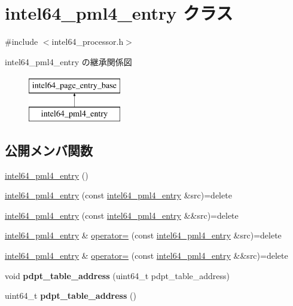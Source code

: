 \hypertarget{classintel64__pml4__entry}{}\section{intel64\+\_\+pml4\+\_\+entry クラス}
\label{classintel64__pml4__entry}


{\ttfamily \#include $<$intel64\+\_\+processor.\+h$>$}

intel64\+\_\+pml4\+\_\+entry の継承関係図\begin{figure}[H]
\begin{center}
\leavevmode
\includegraphics[height=2.000000cm]{classintel64__pml4__entry}
\end{center}
\end{figure}
\subsection*{公開メンバ関数}
\begin{DoxyCompactItemize}
\item 
\hyperlink{classintel64__pml4__entry_acf079a8708e3f1651af9cbd825691b75}{intel64\+\_\+pml4\+\_\+entry} ()
\item 
\hyperlink{classintel64__pml4__entry_aa6b703474769f6a50a5c0a650d7ab054}{intel64\+\_\+pml4\+\_\+entry} (const \hyperlink{classintel64__pml4__entry}{intel64\+\_\+pml4\+\_\+entry} \&src)=delete
\item 
\hyperlink{classintel64__pml4__entry_a9a501655ea95565e7807d1e601ee8dbc}{intel64\+\_\+pml4\+\_\+entry} (const \hyperlink{classintel64__pml4__entry}{intel64\+\_\+pml4\+\_\+entry} \&\&src)=delete
\item 
\hyperlink{classintel64__pml4__entry}{intel64\+\_\+pml4\+\_\+entry} \& \hyperlink{classintel64__pml4__entry_a521515099b02b2905b67fb2036880c10}{operator=} (const \hyperlink{classintel64__pml4__entry}{intel64\+\_\+pml4\+\_\+entry} \&src)=delete
\item 
\hyperlink{classintel64__pml4__entry}{intel64\+\_\+pml4\+\_\+entry} \& \hyperlink{classintel64__pml4__entry_a92ee32ab153d91b61321ec40ca243f9f}{operator=} (const \hyperlink{classintel64__pml4__entry}{intel64\+\_\+pml4\+\_\+entry} \&\&src)=delete
\item 
\hypertarget{classintel64__pml4__entry_a6069d5d2bb56d249c485038171e138f1}{}\label{classintel64__pml4__entry_a6069d5d2bb56d249c485038171e138f1} 
void {\bfseries pdpt\+\_\+table\+\_\+address} (uint64\+\_\+t pdpt\+\_\+table\+\_\+address)
\item 
\hypertarget{classintel64__pml4__entry_ae0d9b34a4017d1f36735184fb12d30c4}{}\label{classintel64__pml4__entry_ae0d9b34a4017d1f36735184fb12d30c4} 
uint64\+\_\+t {\bfseries pdpt\+\_\+table\+\_\+address} ()
\end{DoxyCompactItemize}
